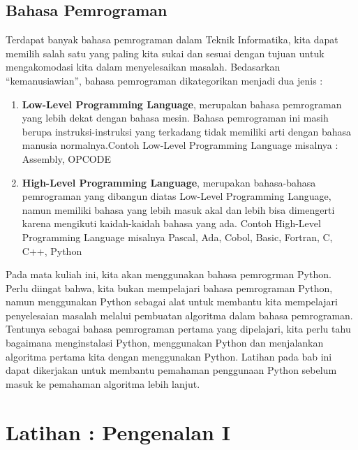 \subsection{Bahasa Pemrograman}
Terdapat banyak bahasa pemrograman dalam Teknik Informatika, kita dapat memilih salah satu yang paling kita sukai dan sesuai dengan tujuan untuk mengakomodasi kita dalam menyelesaikan masalah. Bedasarkan “kemanusiawian”, bahasa pemrograman dikategorikan menjadi dua jenis : 
\begin{enumerate}
	\item \textbf{Low-Level Programming Language}, merupakan bahasa pemrograman yang lebih dekat dengan bahasa mesin. Bahasa pemrograman ini masih berupa instruksi-instruksi yang terkadang tidak memiliki arti dengan bahasa manusia normalnya.Contoh Low-Level Programming Language misalnya : Assembly, OPCODE
	\item \textbf{High-Level Programming Language}, merupakan bahasa-bahasa pemrograman yang dibangun diatas Low-Level Programming Language, namun memiliki bahasa yang lebih masuk akal dan lebih bisa dimengerti karena mengikuti kaidah-kaidah bahasa yang ada. Contoh High-Level Programming Language misalnya	Pascal, Ada, Cobol, Basic, Fortran, C, C++, Python
	\end{enumerate}

Pada mata kuliah ini, kita akan menggunakan bahasa pemrogrman Python. Perlu diingat bahwa, kita bukan mempelajari bahasa pemrograman Python, namun menggunakan Python sebagai alat untuk membantu kita mempelajari penyelesaian masalah melalui pembuatan algoritma dalam bahasa pemrograman.
Tentunya sebagai bahasa pemrograman pertama yang dipelajari, kita perlu tahu bagaimana menginstalasi Python, menggunakan Python dan menjalankan algoritma pertama kita dengan menggunakan Python. Latihan pada bab ini dapat dikerjakan untuk membantu pemahaman penggunaan Python sebelum masuk ke pemahaman algoritma lebih lanjut. 

\newpage
\section{Latihan : Pengenalan I}

